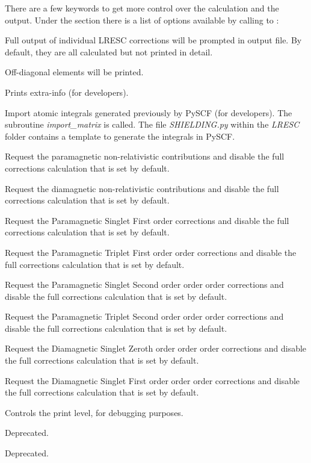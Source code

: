 There are a few keywords to get more control over the calculation and the output. Under the  section there is a list of options available by calling to :
\begin{list}{}{}
\item[\Key{PRTALL}] Full output of individual LRESC corrections will be prompted in output file. By default, they are all calculated but not printed in detail.
\item[\Key{PRTTENSOR}] Off-diagonal elements will be printed.
\item[\Key{EXTRAINFO}] Prints extra-info (for developers).
\item[\Key{PYINTS}] Import atomic integrals generated previously by PySCF (for developers). The subroutine \textit{import\_matrix} is called. The file \textit{SHIELDING.py} within the \textit{LRESC} folder contains a template to generate the integrals in PySCF.
\item[\Key{PARANR}] Request the paramagnetic non-relativistic contributions and disable the full corrections calculation that is set by default.
\item[\Key{DIANR}] Request the diamagnetic non-relativistic contributions and disable the full corrections calculation that is set by default.
\item[\Key{PARA1S}] Request the Paramagnetic Singlet First order corrections and disable the full corrections calculation that is set by default.
\item[\Key{PARA1T}] Request the Paramagnetic Triplet First order order corrections and disable the full corrections calculation that is set by default.
\item[\Key{PARA2S}] Request the Paramagnetic Singlet Second order order order corrections and disable the full corrections calculation that is set by default.
\item[\Key{PARA2T}] Request the Paramagnetic Triplet Second order order order corrections and disable the full corrections calculation that is set by default.
\item[\Key{DIAM0S}] Request the Diamagnetic Singlet Zeroth order order order corrections and disable the full corrections calculation that is set by default.
\item[\Key{DIAM1S}] Request the Diamagnetic Singlet First order order order corrections and disable the full corrections calculation that is set by default.
\item[\Key{PRINT}] Controls the print level, for debugging purposes.
\item[\Key{SELECT}] Deprecated.
\item[\Key{LRATOM}] Deprecated.
\end{list}



